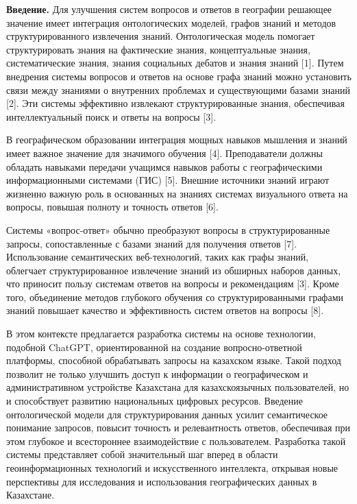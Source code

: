 \begin{multicols}{2}
{\bfseries Введение.} Для улучшения систем вопросов и ответов в географии
решающее значение имеет интеграция онтологических моделей, графов знаний
и методов структурированного извлечения знаний. Онтологическая модель
помогает структурировать знания на фактические знания, концептуальные
знания, систематические знания, знания социальных дебатов и знания
знаний {[}1{]}. Путем внедрения системы вопросов и ответов на основе
графа знаний можно установить связи между знаниями о внутренних
проблемах и существующими базами знаний {[}2{]}. Эти системы эффективно
извлекают структурированные знания, обеспечивая интеллектуальный поиск и
ответы на вопросы {[}3{]}.

В географическом образовании интеграция мощных навыков мышления и знаний
имеет важное значение для значимого обучения {[}4{]}. Преподаватели
должны обладать навыками передачи учащимся навыков работы с
географическими информационными системами (ГИС) {[}5{]}. Внешние
источники знаний играют жизненно важную роль в основанных на знаниях
системах визуального ответа на вопросы, повышая полноту и точность
ответов {[}6{]}.

Системы «вопрос-ответ» обычно преобразуют вопросы в структурированные
запросы, сопоставленные с базами знаний для получения ответов {[}7{]}.
Использование семантических веб-технологий, таких как графы знаний,
облегчает структурированное извлечение знаний из обширных наборов
данных, что приносит пользу системам ответов на вопросы и рекомендациям
{[}3{]}. Кроме того, объединение методов глубокого обучения со
структурированными графами знаний повышает качество и эффективность
систем ответов на вопросы {[}8{]}.

В этом контексте предлагается разработка системы на основе технологии,
подобной ChatGPT, ориентированной на создание вопросно-ответной
платформы, способной обрабатывать запросы на казахском языке. Такой
подход позволит не только улучшить доступ к информации о географическом
и административном устройстве Казахстана для казахскоязычных
пользователей, но и способствует развитию национальных цифровых
ресурсов. Введение онтологической модели для структурирования данных
усилит семантическое понимание запросов, повысит точность и
релевантность ответов, обеспечивая при этом глубокое и всестороннее
взаимодействие с пользователем. Разработка такой системы представляет
собой значительный шаг вперед в области геоинформационных технологий и
искусственного интеллекта, открывая новые перспективы для исследования и
использования географических данных в Казахстане.


\end{multicols}
